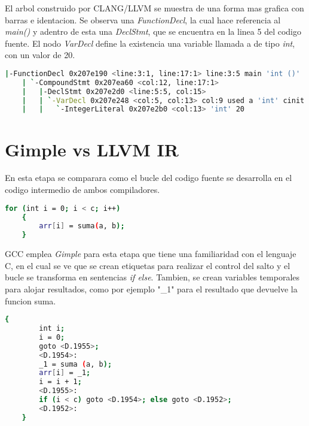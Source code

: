 El arbol construido por CLANG/LLVM se muestra de una forma mas grafica con barras e identacion. 
Se observa una \emph{FunctionDecl}, la cual hace referencia al \emph{main()} y adentro de esta una 
\emph{DeclStmt}, que se encuentra en la linea 5 del codigo fuente. El nodo \emph{VarDecl} 
define la existencia una variable llamada a de tipo \emph{int}, con un valor de 20.

\begin{lstlisting}[label=comandoC, caption= Fragmento del arbol de CLANG/LLVM del archivo ast. \cite{repositorio}, language=bash]
    |-FunctionDecl 0x207e190 <line:3:1, line:17:1> line:3:5 main 'int ()'
    | `-CompoundStmt 0x207ea60 <col:12, line:17:1>
    |   |-DeclStmt 0x207e2d0 <line:5:5, col:15>
    |   | `-VarDecl 0x207e248 <col:5, col:13> col:9 used a 'int' cinit
    |   |   `-IntegerLiteral 0x207e2b0 <col:13> 'int' 20   \end{lstlisting}


\section{Gimple vs LLVM IR}

En esta etapa se comparara como el bucle del codigo fuente se desarrolla en el codigo intermedio 
de ambos compiladores. 

\begin{lstlisting}[label=comandoC, caption= Fragmento del codigo fuente del archivo codigo-ejemplo.c. \cite{repositorio}, language=bash]
    for (int i = 0; i < c; i++)
    {
        arr[i] = suma(a, b);
    }   \end{lstlisting}

GCC emplea \emph{Gimple} para esta etapa que tiene una familiaridad con el lenguaje C, 
en el cual se ve que se crean etiquetas para realizar el control del salto 
y el bucle se transforma en sentencias \emph{if else}. Tambien, se crean variables 
temporales para alojar resultados, como por ejemplo "\_1" para el resultado que 
devuelve la funcion suma.  

\begin{lstlisting}[label=comandoC, caption= Fragmento del \emph{Gimple} de GCC del archivo codigo-ejemplo.c.006t.gimple. \cite{repositorio}, language=bash]
    {
        int i;
        i = 0;
        goto <D.1955>;
        <D.1954>:
        _1 = suma (a, b);
        arr[i] = _1;
        i = i + 1;
        <D.1955>:
        if (i < c) goto <D.1954>; else goto <D.1952>;
        <D.1952>:
    } \end{lstlisting}

